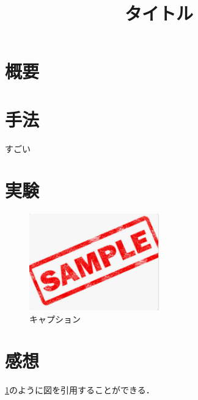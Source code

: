 \documentclass[uplatex]{jsarticle}
\title{タイトル}
\author{\empty}
\date{\empty}
\theoremstyle{remark}
\begin{document}
\maketitle

\section{概要}

\section{手法}
\cite{mypaper}すごい
\section{実験}

\begin{figure}
  \centering
  \includegraphics[width=0.5\textwidth]{img/image.png}
  \caption{キャプション}
  \label{fig:template}
\end{figure}

\section{感想}
\ref{fig:template}のように図を引用することができる．




\end{document}
